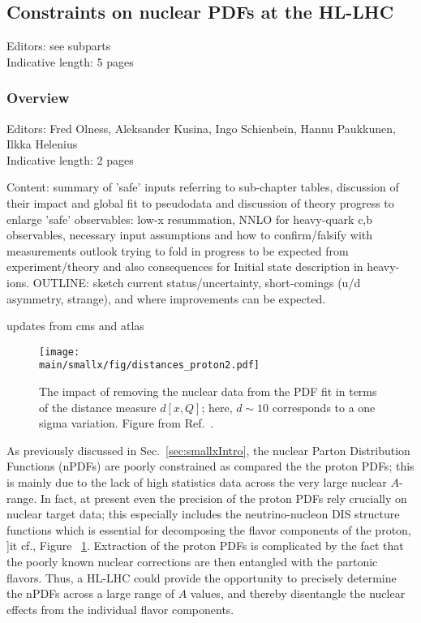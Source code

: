 \documentclass[../report.tex]{subfiles}
\providecommand{\main}{..}
\begin{document}
\subsection{Constraints on nuclear PDFs at the HL-LHC}
\label{sec:nPDFs}
Editors: see subparts\\
Indicative length: 5 pages
\subsubsection{Overview}
Editors: Fred Olness, Aleksander Kusina, Ingo Schienbein, Hannu Paukkunen,   Ilkka Helenius\\
Indicative length: 2 pages 

\color{blue}
Content: summary of 'safe' inputs referring to sub-chapter tables, discussion of their impact and global fit to pseudodata and discussion of theory progress to enlarge 'safe' observables: low-x resummation, NNLO for heavy-quark c,b observables, necessary input assumptions and how to confirm/falsify with measurements
outlook trying to fold in progress to be expected from experiment/theory and also consequences for Initial state description in heavy-ions.  OUTLINE: sketch current status/uncertainty, short-comings (u/d asymmetry, strange),
and where improvements can be expected.

updates from cms\cite{Chatrchyan:2013uja} and atlas\cite{Aad:2014xca}

\color{black}

\begin{figure}[tbh] %
\centering{} 
\texttt{[image: \\main/smallx/fig/distances\_proton2.pdf]}
\caption{
The impact of removing the nuclear data from the PDF fit  
in terms of the distance measure $d[x,Q]$;  here,  $d \sim 10$ corresponds to a one sigma variation. 
Figure from  Ref.~\cite{Ball:2017nwa}.
}
\label{fig:nnpdfDistance}
\end{figure}


As previously discussed in Sec.~\ref{sec:smallxIntro}, the nuclear Parton Distribution Functions (nPDFs) are poorly constrained as compared the the proton PDFs; this is mainly due to the lack of high statistics data across the very 
large nuclear $A$-range. 
%
In fact, at present even the precision of the proton PDFs  rely crucially on 
nuclear target data; this especially  includes the neutrino-nucleon DIS structure functions which is essential for decomposing the flavor components of the proton, {]it cf., } Figure ~\ref{fig:nnpdfDistance}.
Extraction of the proton PDFs is complicated by the fact that the poorly known nuclear corrections are then entangled with the partonic flavors. 
%
Thus, a HL-LHC could provide the opportunity to precisely determine 
the nPDFs across a large range of $A$ values, and thereby
disentangle the nuclear effects from the individual flavor components. 
\end{document}
